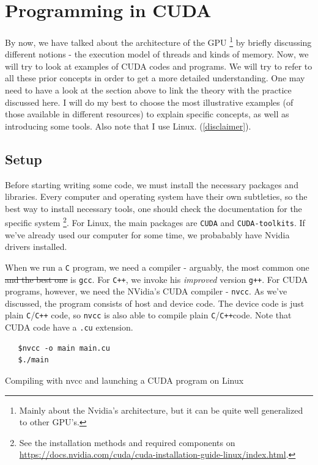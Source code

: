 \section{Programming in CUDA}

\paragraph{} By now, we have talked about the architecture of the GPU \footnote{Mainly about the Nvidia's architecture, but it 
can be quite well generalized to other GPU's.} by briefly discussing different notions - 
the execution model of threads and kinds of memory. Now, we will try to look at examples of CUDA codes and programs. 
We will try to refer to 
all these prior concepts in order to get a more detailed understanding. One may need to have a look at the section above 
to link the theory with the practice discussed here. I will do my best to choose the most illustrative examples (of those available 
in different resources) to explain specific concepts, 
as well as introducing some tools. 
Also note that I use Linux. (\autoref{disclaimer}).

\subsection{Setup}
Before starting writing some code, we must install the necessary packages and libraries. Every computer and operating system 
have their own subtleties, so the best way to install necessary tools, one should check the documentation for the specific system
\footnote{See the installation methods and required components on \url{https://docs.nvidia.com/cuda/cuda-installation-guide-linux/index.html}.}.
For Linux, the main packages are \verb|CUDA| and \verb|CUDA-toolkits|. If we've already used our computer for some time,
we probabably have Nvidia drivers installed. 



When we run a \verb|C| program, we need a compiler - arguably, the most common one \sout{and the best one} is \verb|gcc|. For \verb|C++|, 
we invoke his \textit{improved} version \verb|g++|. For CUDA programs, however, we need the NVidia's CUDA compiler -
\verb|nvcc|. As we've discussed, the program 
consists of host and device code. The device code is just plain \verb|C|/\verb|C++| code, so \verb|nvcc| is also able 
to compile plain \verb|C|/\verb|C++|code. Note that CUDA code have a \verb|.cu| extension.

\begin{listing}[!ht]
\begin{verbatim}
   $nvcc -o main main.cu
   $./main
\end{verbatim}
\vspace{-0.7cm}
\caption{Compiling with nvcc and launching a CUDA program on Linux}
\label{nvcc_cuda}
\end{listing}

